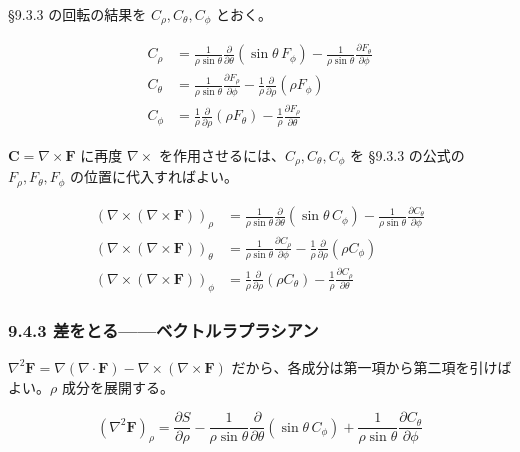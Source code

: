 \documentclass[a4paper,12pt,openany]{book}
\begin{document}
§9.3.3 の回転の結果を \(C_\rho, C_\theta, C_\phi\) とおく。

\[\begin{aligned}
C_\rho &= \frac{1}{\rho\sin\theta}\frac{\partial}{\partial\theta}(\sin\theta\,F_\phi) - \frac{1}{\rho\sin\theta}\frac{\partial F_\theta}{\partial\phi} \\[0.3em]
C_\theta &= \frac{1}{\rho\sin\theta}\frac{\partial F_\rho}{\partial\phi} - \frac{1}{\rho}\frac{\partial}{\partial\rho}(\rho F_\phi) \\[0.3em]
C_\phi &= \frac{1}{\rho}\frac{\partial}{\partial\rho}(\rho F_\theta) - \frac{1}{\rho}\frac{\partial F_\rho}{\partial\theta}
\end{aligned}\]

\(\mathbf{C} = \nabla\times\mathbf{F}\) に再度 \(\nabla\times\)
を作用させるには、\(C_\rho, C_\theta, C_\phi\) を §9.3.3 の公式の
\(F_\rho, F_\theta, F_\phi\) の位置に代入すればよい。

\[\begin{aligned}
(\nabla\times(\nabla\times\mathbf{F}))_\rho &= \frac{1}{\rho\sin\theta}\frac{\partial}{\partial\theta}(\sin\theta\,C_\phi) - \frac{1}{\rho\sin\theta}\frac{\partial C_\theta}{\partial\phi} \\[0.5em]
(\nabla\times(\nabla\times\mathbf{F}))_\theta &= \frac{1}{\rho\sin\theta}\frac{\partial C_\rho}{\partial\phi} - \frac{1}{\rho}\frac{\partial}{\partial\rho}(\rho C_\phi) \\[0.5em]
(\nabla\times(\nabla\times\mathbf{F}))_\phi &= \frac{1}{\rho}\frac{\partial}{\partial\rho}(\rho C_\theta) - \frac{1}{\rho}\frac{\partial C_\rho}{\partial\theta}
\end{aligned}\]

\hypertarget{ux5deeux3092ux3068ux308bux30d9ux30afux30c8ux30ebux30e9ux30d7ux30e9ux30b7ux30a2ux30f3}{%
\subsubsection{9.4.3
差をとる——ベクトルラプラシアン}\label{ux5deeux3092ux3068ux308bux30d9ux30afux30c8ux30ebux30e9ux30d7ux30e9ux30b7ux30a2ux30f3}}

\(\nabla^2\mathbf{F} = \nabla(\nabla\cdot\mathbf{F}) - \nabla\times(\nabla\times\mathbf{F})\)
だから、各成分は第一項から第二項を引けばよい。\(\rho\) 成分を展開する。

\[(\nabla^2\mathbf{F})_\rho = \frac{\partial S}{\partial\rho} - \frac{1}{\rho\sin\theta}\frac{\partial}{\partial\theta}(\sin\theta\,C_\phi) + \frac{1}{\rho\sin\theta}\frac{\partial C_\theta}{\partial\phi}\]
\end{document}
